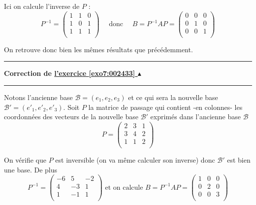 \documentclass[11pt,a4paper]{article}
\newcounter{exo}
\newcommand{\correction}[1]{\hypertarget{cor7:#1}{}\label{cor7:#1}{\bf Correction de \hyperlink{exo7:#1}{l'exercice \ref{exo7:#1} $\blacktriangle$}}\vspace{1mm}\hrule\vspace{1mm}}
\newcommand{\fincorrection}{\vspace{1mm}\hrule\vspace*{7mm}}
\begin{document}
\begin{enumerate}
Ici on calcule l'inverse de $P$ :
$$P^{-1} = \begin{pmatrix}
1 & 1 & 0 \\
1 & 0 & 1 \\
1 & 1 & 1 \\    
\end{pmatrix}
\quad \text{ donc } \quad 
B=P^{-1}AP=\begin{pmatrix}
0 & 0 & 0 \\
0 & 1 & 0 \\
0 & 0 & 1 \\   
\end{pmatrix}
$$

On retrouve donc bien les mêmes résultats que précédemment.

\end{enumerate}

\fincorrection
\correction{002433}
Notons l'ancienne base $\mathcal{B}=(e_1,e_2,e_3)$
et ce qui sera la nouvelle base $\mathcal{B}'=(e'_1,e'_2,e'_3)$.
Soit $P$ la matrice de passage qui contient -en colonnes- les coordonnées des vecteurs
de la nouvelle base $\mathcal{B}'$ exprimés dans l'ancienne base $\mathcal{B}$
$$P=\begin{pmatrix}
2 & 3 & 1 \\
3 & 4 & 2 \\
1 & 1 & 2 \\      
\end{pmatrix}$$

On vérifie que $P$ est inversible (on va même calculer son inverse) donc
$\mathcal{B}'$ est bien une base.
De plus 
$$P^{-1} = \begin{pmatrix}
-6 & 5 & -2 \\
4 & -3 & 1 \\
1 & -1 & 1 \\             
           \end{pmatrix}
\text{ et on calcule  } B=P^{-1} A P = 
\begin{pmatrix}
1 & 0 & 0 \\
0 & 2 & 0 \\
0 & 0 & 3 \\  
\end{pmatrix}$$
\end{document}
